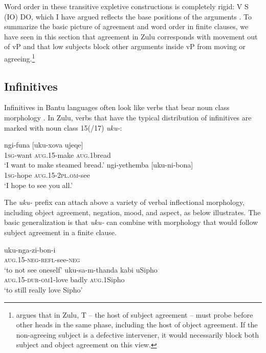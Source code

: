 \documentclass[output=paper,colorlinks,citecolor=brown]{langscibook}
\begin{document}
Word order in these transitive expletive constructions is completely rigid: V S (IO) DO, which I have argued reflects the base positions of the arguments \citep{Halpert2015}. To summarize the basic picture of agreement and word order in finite clauses, we have seen in this section that agreement in Zulu corresponds with movement out of vP and that low subjects block other arguments inside vP from moving or agreeing.\footnote{\citet{Zeller2015} argues that in Zulu, T – the host of subject agreement – must probe before other heads in the same phase, including the host of object agreement.  If the non-agreeing subject is a defective intervener, it would necessarily block both subject and object agreement on this view.} 
 
\subsection{Infinitives}\label{sec:halpert:2.2}
 
Infinitives in Bantu languages often look like verbs that bear noun class morphology \citep{Schadeberg2003}. In Zulu, verbs that have the typical distribution of infinitives are marked with noun class 15(/17) \textit{uku-}:

\ea%
    \label{ex:halpert:7}
    \ea%
    \label{ex:halpert:7a}
    \gll    ngi-funa [uku-xova ujeqe]\\
            1\textsc{sg}-want  \textsc{aug}.15-make \textsc{aug}.1bread\\
    \glt    `I want to make steamed bread.'
    \ex%
    \gll    ngi-yethemba [uku-ni-bona]\\
            1\textsc{sg}-hope  \textsc{aug}.15-2\textsc{pl}.\textsc{om}-see\\
    \glt    `I hope to see you all.'
    \z 
\z 

The \textit{uku-} prefix can attach above a variety of verbal inflectional morphology, including object agreement, negation, mood, and aspect, as  below illustrates.  The basic generalization is that \textit{uku-} can combine with morphology that would follow subject agreement in a finite clause.

\ea%
    \label{ex:halpert:8}
    \ea%
    \label{ex:halpert:8a}
    \gll    uku-nga-zi-bon-i\\
            \textsc{aug}.15-\textsc{neg}-\textsc{refl}-see-\textsc{neg}\\
    \glt    `to not see oneself'
    \ex%
    \label{ex:halpert:8b}
    \gll    uku-sa-m-thanda kabi uSipho\\
            \textsc{aug}.15-\textsc{dur}-\textsc{om}1-love badly \textsc{aug}.1Sipho\\
    \glt    `to still really love Sipho'
    \z 
\z 
\end{document}
